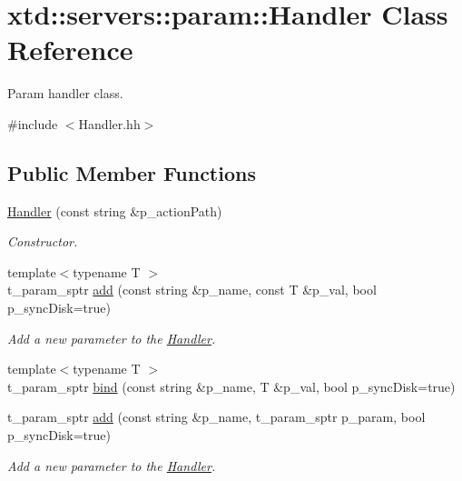 \hypertarget{classxtd_1_1servers_1_1param_1_1Handler}{\section{xtd\-:\-:servers\-:\-:param\-:\-:Handler Class Reference}
\label{classxtd_1_1servers_1_1param_1_1Handler}
}


Param handler class.  




{\ttfamily \#include $<$Handler.\-hh$>$}

\subsection*{Public Member Functions}
\begin{DoxyCompactItemize}
\item 
\hyperlink{classxtd_1_1servers_1_1param_1_1Handler_a93996915b562641b4673381c9abfae7b}{Handler} (const string \&p\-\_\-action\-Path)
\begin{DoxyCompactList}\small\item\em Constructor. \end{DoxyCompactList}\item 
{\footnotesize template$<$typename T $>$ }\\t\-\_\-param\-\_\-sptr \hyperlink{classxtd_1_1servers_1_1param_1_1Handler_a53a10d8d422013e62363e0d28d4e9017}{add} (const string \&p\-\_\-name, const T \&p\-\_\-val, bool p\-\_\-sync\-Disk=true)
\begin{DoxyCompactList}\small\item\em Add a new parameter to the \hyperlink{classxtd_1_1servers_1_1param_1_1Handler}{Handler}. \end{DoxyCompactList}\item 
{\footnotesize template$<$typename T $>$ }\\t\-\_\-param\-\_\-sptr \hyperlink{classxtd_1_1servers_1_1param_1_1Handler_a3bc858ae5bb7b6ce1f4d0a5eb327d17f}{bind} (const string \&p\-\_\-name, T \&p\-\_\-val, bool p\-\_\-sync\-Disk=true)
\item 
t\-\_\-param\-\_\-sptr \hyperlink{classxtd_1_1servers_1_1param_1_1Handler_a72a575bef0683ae6197c9f34cdf31d8f}{add} (const string \&p\-\_\-name, t\-\_\-param\-\_\-sptr p\-\_\-param, bool p\-\_\-sync\-Disk=true)
\begin{DoxyCompactList}\small\item\em Add a new parameter to the \hyperlink{classxtd_1_1servers_1_1param_1_1Handler}{Handler}. \end{DoxyCompactList}\item 

\end{DoxyCompactItemize}
